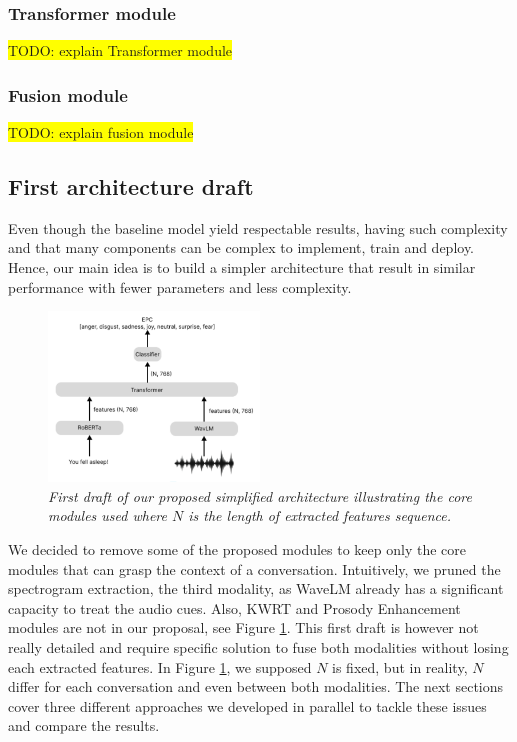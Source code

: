 \documentclass{article}
\begin{document}
\subsubsection{Transformer module}
\colorbox{yellow}{TODO: explain Transformer module}\\

\subsubsection{Fusion module}
\colorbox{yellow}{TODO: explain fusion module}\\



\subsection{First architecture draft}
Even though the baseline model yield respectable results, having such complexity and that many components can be complex to implement, train and deploy. Hence, our main idea is to build a simpler architecture that result in similar performance with fewer parameters and less complexity.

\begin{figure}[htbp]
  \centering
  \includegraphics[width=0.5\textwidth]{Images/architecture_draft.png}
  \caption{\textit{First draft of our proposed simplified architecture illustrating the core modules used where $N$ is the length of extracted features sequence.}}
  \label{fig:DraftArchitecture}
\end{figure}

We decided to remove some of the proposed modules to keep only the core modules that can grasp the context of a conversation. Intuitively, we pruned the spectrogram extraction, the third modality, as WaveLM already has a significant capacity to treat the audio cues.
Also, KWRT and Prosody Enhancement modules are not in our proposal, see Figure \ref{fig:DraftArchitecture}. This first draft is however not really detailed and require specific solution to fuse both modalities without losing each extracted features. In Figure \ref{fig:DraftArchitecture}, we supposed $N$ is fixed, but in reality, $N$ differ for each conversation and even between both modalities. The next sections cover three different approaches we developed in parallel to tackle these issues and compare the results.
\end{document}
